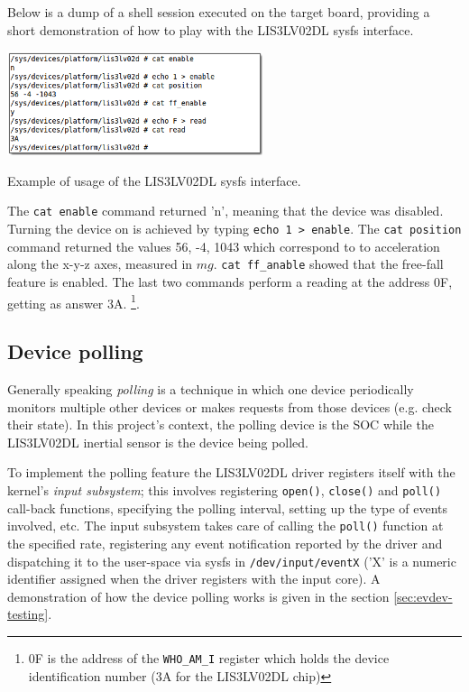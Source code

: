 \documentclass[a4paper,10pt]{article}
\makeatletter
\newenvironment{figurehere}{\def\@captype{figure}\vspace{2ex}}{\vspace{2ex}}
\newcommand{\keyword}[1]{\texttt{#1}}
\makeatother
\begin{document}
\begin{multicols}{2}
Below is a dump of a shell session executed on the target board, providing a
short demonstration of how to play with the LIS3LV02DL sysfs interface.

\begin{figurehere}
 \centering
 \includegraphics[width=7.5cm]{./figures/dump-lis3lv02d-sysfs.png}
 \caption{Example of usage of the LIS3LV02DL sysfs interface.}
 \label{fig:lis3-sysfs}
\end{figurehere}

The \keyword{cat enable} command returned 'n', meaning that the device was
disabled.
Turning the device on is achieved by typing \keyword{echo 1 > enable}.
The \keyword{cat position} command returned the values 56, -4, 1043 which
correspond to to acceleration along the x-y-z axes, measured in $mg$.
\keyword{cat ff\_anable} showed that the free-fall feature is enabled.
The last two commands perform a reading at the address 0F, getting as answer 3A.
\footnote{0F is the address of the \keyword{WHO\_AM\_I} register which holds
the device identification number (3A for the LIS3LV02DL chip)}.



\subsection{Device polling}
\label{sec:lis3_poll}

Generally speaking \emph{polling} is a technique in which one device periodically
monitors multiple other devices or makes requests from those devices (e.g. check
their state). In this project's context, the polling device is the SOC while the
LIS3LV02DL inertial sensor is the device being polled.

To implement the polling feature the LIS3LV02DL driver registers itself with the
kernel's \emph{input subsystem}; this involves registering \keyword{open()},
\keyword{close()} and \keyword{poll()} call-back functions, specifying
the polling interval, setting up the type of events involved, etc.
The input subsystem takes care of calling the \keyword{poll()} function at the
specified rate, registering any event notification reported by the driver and
dispatching it to the user-space via sysfs in
\keyword{/dev/input/eventX} ('X' is a numeric identifier assigned when the
driver registers with the input core).
A demonstration of how the device polling works is given in the section
\ref{sec:evdev-testing}.


\end{multicols}
\end{document}
